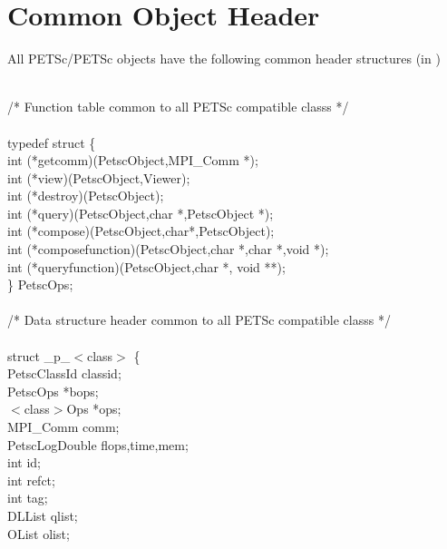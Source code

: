 \documentclass[twoside,12pt]{../sty/report_petsc}
\begin{document}
\section{Common Object Header}

All PETSc/PETSc objects have the following common header structures
(in )

\begin{tabbing}
\\
/* Function table common to all PETSc compatible classs */\\
\\
typedef struct \{ \\
   int (*getcomm)(PetscObject,MPI\_Comm *);\\
   int (*view)(PetscObject,Viewer);\\
   int (*destroy)(PetscObject);\\
   int (*query)(PetscObject,char *,PetscObject *);\\
   int (*compose)(PetscObject,char*,PetscObject);\\
   int (*composefunction)(PetscObject,char *,char *,void *);\\
   int (*queryfunction)(PetscObject,char *, void **);\\
\} PetscOps;\\
\\
/* Data structure header common to all PETSc compatible classs */\\
\\
struct \_p\_$<$class$>$ \{\\
  PetscClassId     classid;                                  \\
  PetscOps         *bops;                                   \\
  $<$class$>$Ops   *ops;                                    \\
  MPI\_Comm         comm;                                    \\
  PetscLogDouble  flops,time,mem;                          \\
  int              id;                                      \\
  int              refct;                                   \\
  int              tag;                                     \\
  DLList           qlist;                                   \\
  OList            olist;                                   \\

\end{tabbing}
\end{document}
